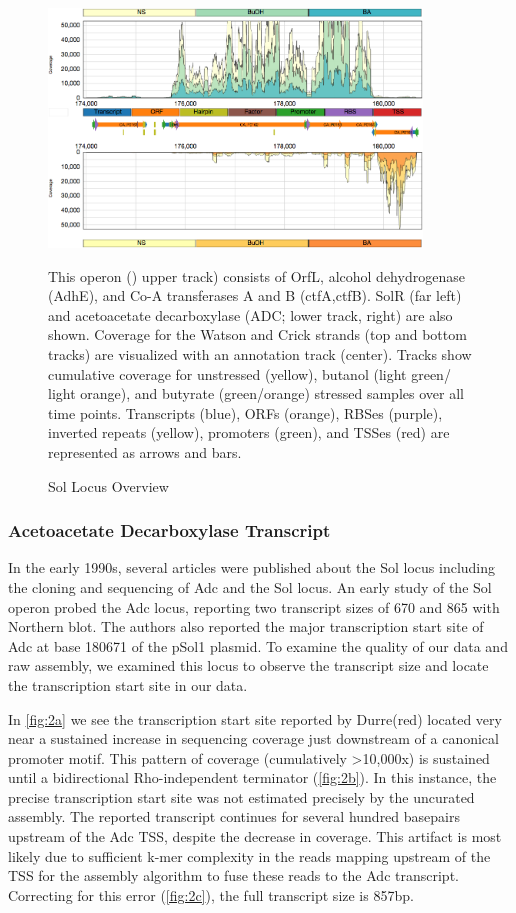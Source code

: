 \begin{figure}
\small
{\includegraphics[width=\textwidth,height=2.5in]{images/Assembly/Examples/Sol/Sol-locus-curated.png}
\label{fig:1a}}
\caption{Sol Locus Overview} This operon () upper track) consists of OrfL, alcohol dehydrogenase (AdhE), and Co-A transferases A and B (ctfA,ctfB). SolR (far left) and acetoacetate decarboxylase (ADC;  lower track, right) are also shown. Coverage for the Watson and Crick strands (top and bottom tracks) are visualized with an annotation track (center). Tracks show cumulative coverage for unstressed (yellow), butanol (light green/ light orange), and butyrate (green/orange) stressed samples over all time points. Transcripts (blue), ORFs (orange), RBSes (purple), inverted repeats (yellow), promoters (green), and TSSes (red) are represented as arrows and bars.
\end{figure}

\subsubsection{Acetoacetate Decarboxylase Transcript}
In the early 1990s, several articles were published about the Sol locus including the cloning and sequencing of Adc and the Sol locus\cite{62,63,64,65,66}. An early study of the Sol operon probed the Adc locus, reporting two transcript sizes of 670 and 865 with Northern blot\cite{65}. The authors also reported the major transcription start site of Adc at base 180671 of the pSol1 plasmid. To examine the quality of our data and raw assembly, we examined this locus to observe the transcript size and locate the transcription start site in our data. 

In \ref{fig:2a} we see the transcription start site reported by Durre(red) located very near a sustained increase in sequencing coverage just downstream of a canonical promoter motif. This pattern of coverage (cumulatively \textgreater 10,000x) is sustained until a bidirectional Rho-independent terminator (\ref{fig:2b}). In this instance, the precise transcription start site was not estimated precisely by the uncurated assembly. The reported transcript continues for several hundred basepairs upstream of the Adc TSS, despite the decrease in coverage. This artifact is most likely due to sufficient k-mer complexity in the reads mapping upstream of the TSS for the assembly algorithm to fuse these reads to the Adc transcript. Correcting for this error (\ref{fig:2c}), the full transcript size is 857bp.

